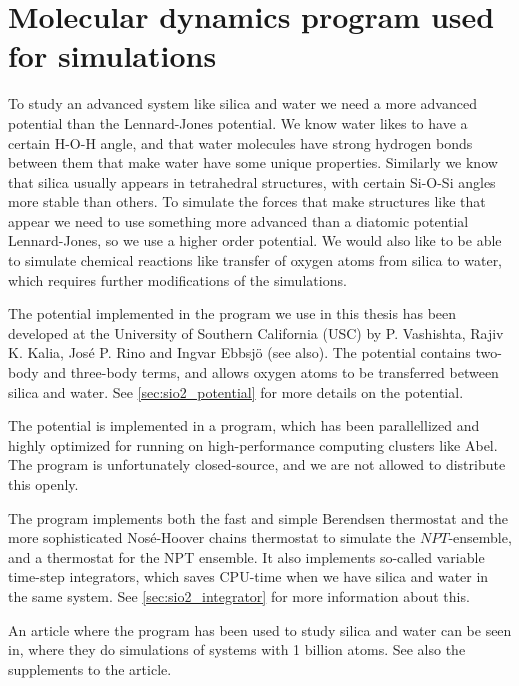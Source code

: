 \chapter{Molecular dynamics program used for simulations}
To study an advanced system like silica and water we need a more advanced potential than the Lennard-Jones potential. We know water likes to have a certain H-O-H angle, and that water molecules have strong hydrogen bonds between them that make water have some unique properties. Similarly we know that silica usually appears in tetrahedral structures, with certain Si-O-Si angles more stable than others. To simulate the forces that make structures like that appear we need to use something more advanced than a diatomic potential Lennard-Jones, so we use a higher order potential. We would also like to be able to simulate chemical reactions like transfer of oxygen atoms from silica to water, which requires further modifications of the simulations.

The potential implemented in the program we use in this thesis has been developed at the University of Southern California (USC) by P. Vashishta, Rajiv K. Kalia, José P. Rino and Ingvar Ebbsj\"o\cite{vashishta1990interaction} (see also\cite{shekhar2013nanobubble,shekhar2013nanobubble_supplements}). The potential contains two-body and three-body terms, and allows oxygen atoms to be transferred between silica and water. See \cref{sec:sio2_potential} for more details on the potential.

The potential is implemented in a  program, which has been parallellized and highly optimized for running on high-performance computing clusters like Abel. The program is unfortunately closed-source, and we are not allowed to distribute this openly.

The program implements both the fast and simple Berendsen thermostat and the more sophisticated Nos\'e-Hoover chains thermostat to simulate the $NPT$-ensemble, and a thermostat for the NPT ensemble. It also implements so-called variable time-step integrators, which saves CPU-time when we have silica and water in the same system. See \cref{sec:sio2_integrator} for more information about this.

An article where the program has been used to study silica and water can be seen in\cite{shekhar2013nanobubble}, where they do simulations of systems with 1 billion atoms. See also the supplements to the article\cite{shekhar2013nanobubble_supplements}.

